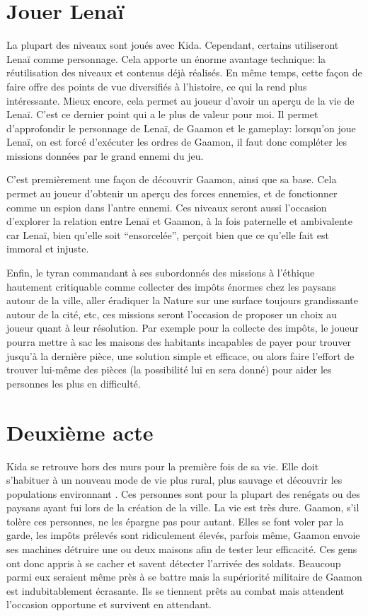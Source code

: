 \section{Jouer Lenaï}
La plupart des niveaux sont joués avec Kida. Cependant, certains utiliseront Lenaï comme personnage. Cela apporte un énorme avantage technique: la réutilisation des niveaux et contenus déjà réalisés. En même temps, cette façon de faire offre des points de vue diversifiés à l'histoire, ce qui la rend plus intéressante. Mieux encore, cela permet au joueur d'avoir un aperçu de la vie de Lenaï. C'est ce dernier point qui a le plus de valeur pour moi. Il permet d'approfondir le personnage de Lenaï, de Gaamon et le gameplay: lorsqu'on joue Lenaï, on est forcé d'exécuter les ordres de Gaamon, il faut donc compléter les missions données par le grand ennemi du jeu.

C'est premièrement une façon de découvrir Gaamon, ainsi que sa base. Cela permet au joueur d'obtenir un aperçu des forces ennemies, et de fonctionner comme un espion dans l'antre ennemi. Ces niveaux seront aussi l'occasion d'explorer la relation entre Lenaï et Gaamon, à la fois paternelle et ambivalente car Lenaï, bien qu'elle soit \enquote{ensorcelée}, perçoit bien que ce qu'elle fait est immoral et injuste.

Enfin, le tyran commandant à ses subordonnés des missions à l'éthique hautement critiquable comme collecter des impôts énormes chez les paysans autour de la ville, aller éradiquer la Nature sur une surface toujours grandissante autour de la cité, etc, ces missions seront l'occasion de proposer un choix au joueur quant à leur résolution. Par exemple pour la collecte des impôts, le joueur pourra mettre à sac les maisons des habitants incapables de payer pour trouver jusqu'à la dernière pièce, une solution simple et efficace, ou alors faire l'effort de  trouver lui-même des pièces (la possibilité lui en sera donné) pour aider les personnes les plus en difficulté.



\section{Deuxième acte}
\label{sec:deuxiemeActe}
Kida se retrouve hors des murs pour la première fois de sa vie. Elle doit s'habituer à un nouveau mode de vie plus rural, plus sauvage et découvrir les populations environnant \nomVille. Ces personnes sont pour la plupart des renégats ou des paysans ayant fui lors de la création de la ville. La vie est très dure. Gaamon, s'il tolère ces personnes, ne les épargne pas pour autant. Elles se font voler par la garde, les impôts prélevés sont ridiculement élevés, parfois même, Gaamon envoie ses machines détruire une ou deux maisons afin de tester leur efficacité. Ces gens ont donc appris à se cacher et savent détecter l'arrivée des soldats. Beaucoup parmi eux seraient même près à se battre mais la supériorité militaire de Gaamon est indubitablement écrasante. Ils se tiennent prêts au combat mais attendent l'occasion opportune et survivent en attendant.

